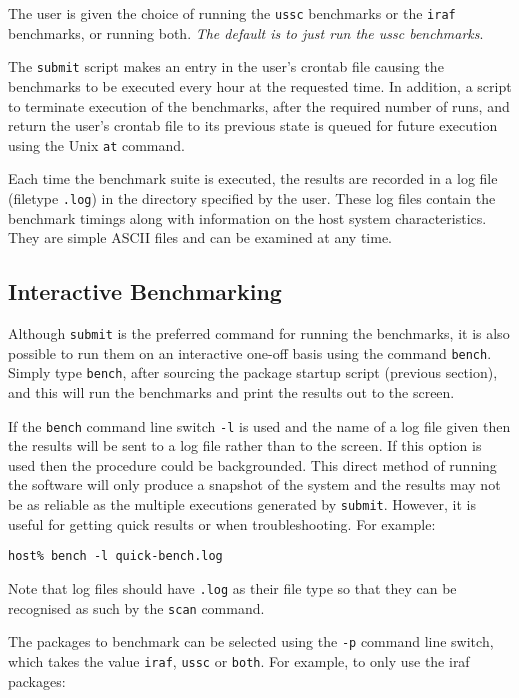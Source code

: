 \begin{enumerate}
The user is given the choice of running the {\tt ussc} benchmarks or the
{\tt iraf} benchmarks, or running both. {\em The default is to just run
the ussc benchmarks}.

The {\tt submit} script makes an entry in the user's crontab file
causing the benchmarks to be executed every hour at the requested time.
In addition, a script to terminate execution of the benchmarks, after
the required number of runs, and return the user's crontab file to its
previous state is queued for future execution using the Unix {\tt at}
command.

Each time the benchmark suite is executed, the results are recorded in
a log file (filetype {\tt .log}) in the directory specified by the
user. These log files contain the benchmark timings along with
information on the host system characteristics. They are simple ASCII
files and can be examined at any time.


\end{enumerate}

\subsection{Interactive Benchmarking}

Although {\tt submit} is the preferred command for running the benchmarks,
it is also possible to run them on an interactive one-off basis
using the command {\tt bench}. Simply type {\tt bench}, after sourcing the
package startup script (previous section), and this will run the benchmarks
and print the results out to the screen.

If the {\tt bench} command line switch {\tt -l} is used and the name of
a log file given then the results will be sent to a log file rather
than to the screen. If this option is used then the procedure could be
backgrounded. This direct method of running the software will only
produce a snapshot of the system and the results may not be as reliable
as the multiple executions generated by {\tt submit}.  However, it is
useful for getting quick results or when troubleshooting.  For
example:

{\tt host\% bench -l quick-bench.log}

Note that log files should have {\tt .log} as their file type so that they
can be recognised as such by the {\tt scan} command.

The packages to benchmark can be selected using the {\tt -p} command line
switch, which takes the value {\tt iraf}, {\tt ussc} or {\tt both}. For
example, to only use the iraf packages:

